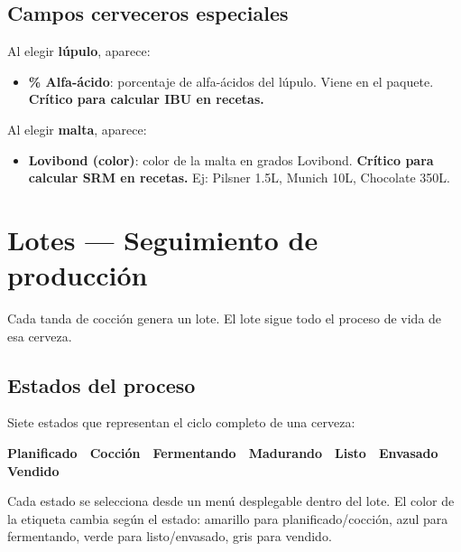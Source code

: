 \documentclass[11pt,a4paper]{report}
\begin{document}
\section{Campos cerveceros especiales}

Al elegir \textbf{lúpulo}, aparece:

\begin{itemize}
  \item \textbf{\% Alfa-ácido}: porcentaje de alfa-ácidos del lúpulo. Viene en el paquete. \textbf{Crítico para calcular IBU en recetas.}
\end{itemize}

Al elegir \textbf{malta}, aparece:

\begin{itemize}
  \item \textbf{Lovibond (color)}: color de la malta en grados Lovibond. \textbf{Crítico para calcular SRM en recetas.} Ej: Pilsner 1.5L, Munich 10L, Chocolate 350L.
\end{itemize}

\chapter{Lotes — Seguimiento de producción}

Cada tanda de cocción genera un lote. El lote sigue todo el proceso de vida de esa cerveza.

\section{Estados del proceso}

Siete estados que representan el ciclo completo de una cerveza:

\begin{center}
\begin{tcolorbox}[colback=yellow!5!white, colframe=beer!30, arc=6pt]
\sffamily\small
\textbf{Planificado} \,\faArrowRight\,
\textbf{Cocción} \,\faArrowRight\,
\textbf{Fermentando} \,\faArrowRight\,
\textbf{Madurando} \,\faArrowRight\,
\textbf{Listo} \,\faArrowRight\,
\textbf{Envasado} \,\faArrowRight\,
\textbf{Vendido}
\end{tcolorbox}
\end{center}

Cada estado se selecciona desde un menú desplegable dentro del lote. El color de la etiqueta cambia según el estado: amarillo para planificado/cocción, azul para fermentando, verde para listo/envasado, gris para vendido.
\end{document}
